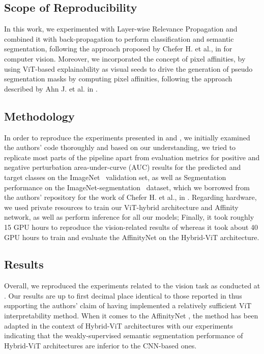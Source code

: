 \subsection{Scope of Reproducibility}
In this work, we experimented with Layer-wise Relevance Propagation and combined it with back-propagation to perform classification and semantic segmentation, following the approach proposed by Chefer H. et al., in \cite{mainpaper} for computer vision. Moreover, we incorporated the concept of pixel affinities, by using ViT-based explainability as visual seeds to drive the generation of pseudo segmentation masks by computing pixel affinities, following the approach described by Ahn J. et al. in \cite{ahn2018learning}.

\subsection{Methodology}
In order to reproduce the experiments presented in \cite{mainpaper} and \cite{ahn2018learning}, we initially examined the authors' code thoroughly and based on our understanding, we tried to replicate most parts of the pipeline apart from evaluation metrics for positive and negative perturbation area-under-curve (AUC) results for the predicted and target classes on the ImageNet~\cite{russakovsky2015ImageNet} validation set, as well as Segmentation performance on the ImageNet-segmentation~\cite{imagenet-seg} dataset, which we borrowed from the authors' repository for the work of Chefer H. et al., in \cite{mainpaper}. Regarding hardware, we used private resources to train our ViT-hybrid architecture and Affinity network, as well as perform inference for all our models; Finally, it took roughly 15 GPU hours to reproduce the vision-related results of \cite{mainpaper} whereas it took about 40 GPU hours to train and evaluate the AffinityNet on the Hybrid-ViT architecture.

\subsection{Results}
Overall, we reproduced the experiments related to the vision task as conducted at \cite{mainpaper}. Our results are up to first decimal place identical to those reported in \cite{mainpaper} thus supporting the authors' claim of having implemented a relatively sufficient ViT interpretability method. When it comes to the AffinityNet \cite{ahn2018learning}, the method has been adapted in the context of Hybrid-ViT architectures with our experiments indicating that the weakly-supervised semantic segmentation performance of Hybrid-ViT architectures are inferior to the CNN-based ones.


